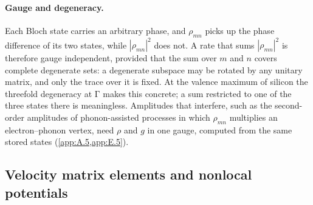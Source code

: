 \paragraph{Gauge and degeneracy.} Each Bloch state carries an arbitrary phase, and $\rho_{mn}$ picks up the phase difference of its two states, while $|\rho_{mn}|^2$ does not. A rate that sums $|\rho_{mn}|^2$ is therefore gauge independent, provided that the sum over $m$ and $n$ covers complete degenerate sets: a degenerate subspace may be rotated by any unitary matrix, and only the trace over it is fixed. At the valence maximum of silicon the threefold degeneracy at $\mathrm{\Gamma}$ makes this concrete; a sum restricted to one of the three states there is meaningless. Amplitudes that interfere, such as the second-order amplitudes of phonon-assisted processes in which $\rho_{mn}$ multiplies an electron--phonon vertex, need $\rho$ and $g$ in one gauge, computed from the same stored states (\cref{app:A.5,app:E.5}).

\subsection{Velocity matrix elements and nonlocal potentials}

